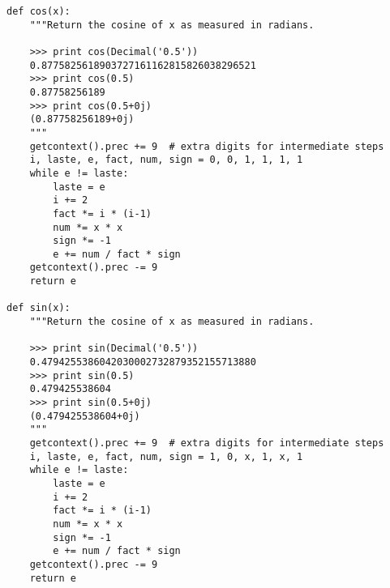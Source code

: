 \begin{verbatim}
def cos(x):
    """Return the cosine of x as measured in radians.

    >>> print cos(Decimal('0.5'))
    0.8775825618903727161162815826038296521
    >>> print cos(0.5)
    0.87758256189
    >>> print cos(0.5+0j)
    (0.87758256189+0j)
    """
    getcontext().prec += 9  # extra digits for intermediate steps
    i, laste, e, fact, num, sign = 0, 0, 1, 1, 1, 1
    while e != laste:
        laste = e    
        i += 2
        fact *= i * (i-1)
        num *= x * x
        sign *= -1
        e += num / fact * sign 
    getcontext().prec -= 9        
    return e    

def sin(x):
    """Return the cosine of x as measured in radians.

    >>> print sin(Decimal('0.5'))
    0.4794255386042030002732879352155713880
    >>> print sin(0.5)
    0.479425538604
    >>> print sin(0.5+0j)
    (0.479425538604+0j)
    """
    getcontext().prec += 9  # extra digits for intermediate steps
    i, laste, e, fact, num, sign = 1, 0, x, 1, x, 1
    while e != laste:
        laste = e    
        i += 2
        fact *= i * (i-1)
        num *= x * x
        sign *= -1
        e += num / fact * sign 
    getcontext().prec -= 9        
    return e

\end{verbatim}                                             
